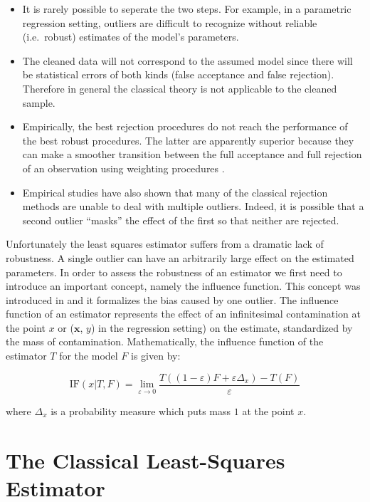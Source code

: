 \documentclass[]{book}
\providecommand{\tightlist}{%
  \setlength{\itemsep}{0pt}\setlength{\parskip}{0pt}}
\theoremstyle{definition}
\theoremstyle{definition}
\theoremstyle{definition}
\theoremstyle{remark}
\begin{document}
\begin{itemize}
\tightlist
\item
  It is rarely possible to seperate the two steps. For example, in a
  parametric regression setting, outliers are difficult to recognize
  without reliable (i.e.~robust) estimates of the model's parameters.
\item
  The cleaned data will not correspond to the assumed model since there
  will be statistical errors of both kinds (false acceptance and false
  rejection). Therefore in general the classical theory is not
  applicable to the cleaned sample.
\item
  Empirically, the best rejection procedures do not reach the
  performance of the best robust procedures. The latter are apparently
  superior because they can make a smoother transition between the full
  acceptance and full rejection of an observation using weighting
  procedures \citet{hampel1987robust}.
\item
  Empirical studies have also shown that many of the classical rejection
  methods are unable to deal with multiple outliers. Indeed, it is
  possible that a second outlier ``masks'' the effect of the first so
  that neither are rejected.
\end{itemize}

Unfortunately the least squares estimator suffers from a dramatic lack
of robustness. A single outlier can have an arbitrarily large effect on
the estimated parameters. In order to assess the robustness of an
estimator we first need to introduce an important concept, namely the
influence function. This concept was introduced in
\citet{hampel1968contributions} and it formalizes the bias caused by one
outlier. The influence function of an estimator represents the effect of
an infinitesimal contamination at the point \(x\) or (\(\mathbf{x}\),
\(y\)) in the regression setting) on the estimate, standardized by the
mass of contamination. Mathematically, the influence function of the
estimator \(T\) for the model \(F\) is given by:

\[\text{IF}(x| T, F) = \lim_{\varepsilon \rightarrow 0} \frac{T\left((1-\varepsilon) F + \varepsilon \Delta_x \right) - T\left(F\right)}{\varepsilon}\]

where \(\Delta_x\) is a probability measure which puts mass \(1\) at the
point \(x\).

\section{The Classical Least-Squares
Estimator}\label{the-classical-least-squares-estimator}
\end{document}
